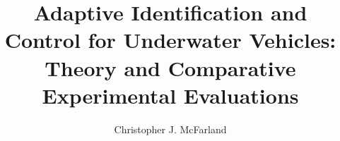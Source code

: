 \documentclass[12pt,twoside,final]{sty/thesis}
\begin{document}
\title{ Adaptive Identification and Control for Underwater Vehicles:\\
Theory and Comparative Experimental Evaluations}

\author{Christopher J. McFarland}
\dissertation
\doctorphilosophy
\copyrightnotice










\appendix


% 
% 
% 



\end{document}
